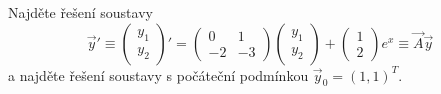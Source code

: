 \begin{ex}
   Najděte řešení soustavy
   \[
      \vec{y}'\equiv
      \begin{pmatrix}
         y_1\\y_2
      \end{pmatrix}'
      =
      \begin{pmatrix}
         0 & 1 \\ -2 & -3
      \end{pmatrix}
      \begin{pmatrix}
         y_1\\y_2
      \end{pmatrix}
      +
      \begin{pmatrix}
         1 \\ 2
      \end{pmatrix}
      e^{x}
      \equiv \vec{A}\vec{y}
   \]
   a najděte řešení soustavy s počáteční podmínkou $\vec{y}_0 = (1,1)^T$.
\end{ex}
